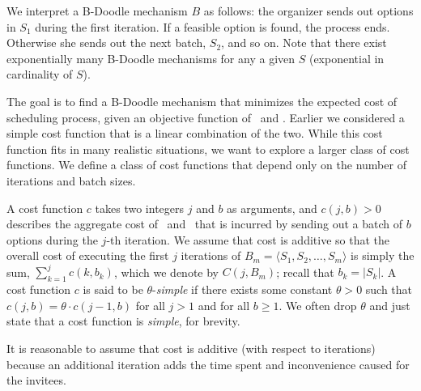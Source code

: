 We interpret a B-Doodle mechanism $B$ as follows: the organizer sends out options in $S_1$ during the first iteration. If a feasible option is found, the process ends. Otherwise she sends out the next batch, $S_2$, and so on.
Note that there exist exponentially many B-Doodle mechanisms for any a given $S$ (exponential in cardinality of $S$).

The goal is to find a B-Doodle mechanism that minimizes the expected cost of scheduling process, given an objective function of \Time\ and \Inconvenience.
Earlier we considered a simple cost function that is a linear combination of the two.
While this cost function fits in many realistic situations, we want to explore a larger class of cost functions.
We define a class of cost functions that depend only on the number of iterations and batch sizes.
\begin{definition} \label{bdoodle:def:CostFunction}
	A cost function $c$ takes two integers $j$ and $b$ as arguments, and $c(j, b) > 0$ describes the aggregate cost of \Time\ and \Inconvenience\ that is incurred by sending out a batch of $b$ options during the $j$-th iteration. We assume that cost is additive so that the overall cost of executing the first $j$ iterations of ${B}_m = \langle S_1, S_2, \dots, S_m \rangle$ is simply the sum, $\sum_{k=1}^{j} c(k, b_k)$, which we denote by $C(j, {B}_m)$; recall that $b_k = |S_k|$.
A cost function $c$ is said to be $\theta$-\emph{simple} if there exists some constant $\theta>0$ such that $c(j, b) = \theta \cdot c(j-1, b)$ for all $j > 1$ and for all $b \geq 1$.
We often drop $\theta$ and just state that a cost function is \emph{simple}, for brevity.
\end{definition}
It is reasonable to assume that cost is additive (with respect to iterations) because an additional iteration adds the time spent and inconvenience caused for the invitees.

